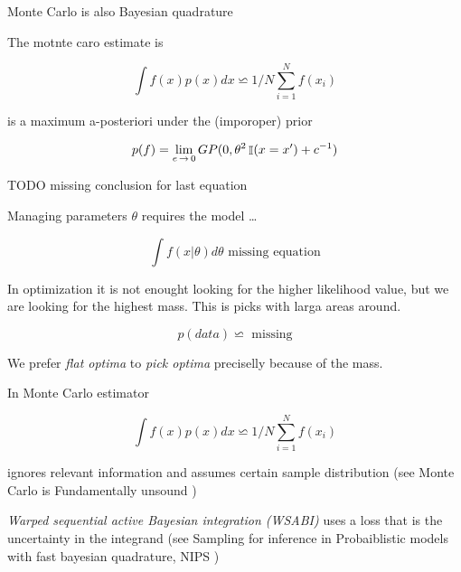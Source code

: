 Monte Carlo is also Bayesian quadrature

The motnte caro estimate is

\begin{equation}
  \int f(x) p(x) dx \backsimeq 1/N \sum_{i=1}^N f(x_i)
\end{equation}

is a maximum a-posteriori under the (imporoper) prior

\begin{equation}
  p(f) = \lim_{e \operatorname*{\rightarrow} 0} GP(0, \theta^2 \operatorname*{\mathbb{\mathop{I}}}(x = x') + c^{-1})
\end{equation}

TODO missing conclusion for last equation

Managing parameters $\theta$ requires the model \dots

\begin{equation}
  \int f(x|\theta) d\theta \text{  missing equation}
\end{equation}


In optimization it is not enought looking for the higher likelihood value, but
we are looking for the highest mass. This is picks with larga areas around.

\begin{equation}
  p(data) \backsimeq  \text{  missing}
\end{equation}

We prefer \emph{flat optima} to \emph{pick optima} preciselly because of the
mass.

In Monte Carlo estimator

\begin{equation}
  \int f(x) p(x) dx \backsimeq 1/N \sum_{i=1}^N f(x_i)
\end{equation}

ignores relevant information and assumes certain sample distribution (see Monte
  Carlo is Fundamentally unsound \cite{o1987monte})

\emph{Warped sequential active Bayesian integration (WSABI)} uses a loss that
is the uncertainty in the integrand (see Sampling for inference in
Probaiblistic models with fast bayesian quadrature, NIPS
\cite{gunter2014sampling})

